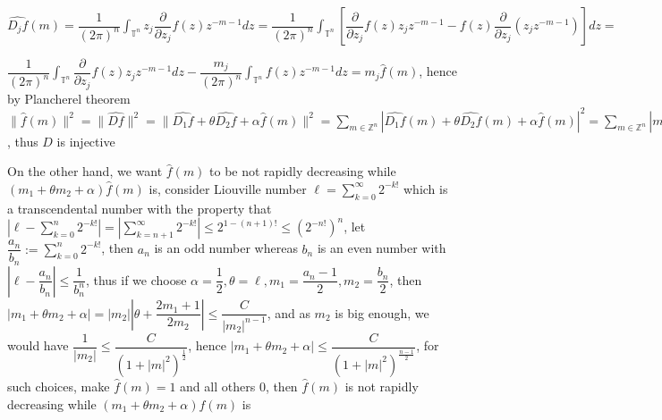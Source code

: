 \documentclass[10pt]{article}
\begin{document}
$\displaystyle\widehat{D_jf}(m)=\dfrac{1}{(2\pi)^n}\int_{\mathbb{T}^n}z_j\dfrac{\partial}{\partial z_j}f(z)z^{-m-1}dz=\dfrac{1}{(2\pi)^n}\int_{\mathbb{T}^n}\left[\dfrac{\partial}{\partial z_j}f(z)z_jz^{-m-1}-f(z)\dfrac{\partial}{\partial z_j}(z_jz^{-m-1})\right]dz=$ \par
$\dfrac{1}{(2\pi)^n}\int_{\mathbb{T}^n}\dfrac{\partial}{\partial z_j}f(z)z_jz^{-m-1}dz-\dfrac{m_j}{(2\pi)^n}\int_{\mathbb{T}^n}f(z)z^{-m-1}dz=m_j\widehat{f}(m)$, hence by Plancherel theorem
$\|\widehat{f}(m)\|^2=\|\widehat{Df}\|^2=\|\widehat{D_1f}+\theta\widehat{D_2f}+\alpha \widehat{f}(m)\|^2=\sum_{m\in\mathbb{Z}^n}|\widehat{D_1f}(m)+\theta\widehat{D_2f}(m)+\alpha \widehat{f}(m)|^2=\sum_{m\in\mathbb{Z}^n}|m_1\widehat{f}+\theta m_2\widehat{f}+\alpha \widehat{f}(m)|^2=\sum_{m\in\mathbb{Z}^n}|m_1+\theta m_2+\alpha|^2|\widehat{f}(m)|^2$, thus $D$ is injective \par
On the other hand, we want $\widehat{f}(m)$ to be not rapidly decreasing while $(m_1+\theta m_2+\alpha)\widehat{f}(m)$ is, consider Liouville number $\ell=\sum_{k=0}^{\infty}2^{-k!}$ which is a transcendental number with the property that $\left|\ell - \sum_{k=0}^{n}2^{-k!}\right|=\left|\sum_{k=n+1}^{\infty}2^{-k!}\right|\leq2^{1-(n+1)!}\leq\left(2^{-n!}\right)^n$, let $\dfrac{a_n}{b_n}:=\sum_{k=0}^{n}2^{-k!}$, then $a_n$ is an odd number whereas $b_n$ is an even number with $\left|\ell - \dfrac{a_n}{b_n}\right|\leq\dfrac{1}{b_n^n}$, thus if we choose $\alpha=\dfrac{1}{2}, \theta=\ell, m_1=\dfrac{a_n-1}{2}, m_2=\dfrac{b_n}{2}$, then $|m_1+\theta m_2+\alpha|=|m_2|\left|\theta + \dfrac{2m_1+1}{2m_2}\right|\leq\dfrac{C}{|m_2|^{n-1}}$, and as $m_2$ is big enough, we would have $\dfrac{1}{|m_2|}\leq\dfrac{C}{\left(1+|m|^2\right)^{\frac{1}{2}}}$, hence $|m_1+\theta m_2+\alpha|\leq\dfrac{C}{\left(1+|m|^2\right)^{\frac{n-1}{2}}}$, for such choices, make $\widehat{f}(m)=1$ and all others $0$, then $\widehat{f}(m)$ is not rapidly decreasing while $(m_1+\theta m_2+\alpha)\widehat{f}(m)$ is \par
\end{document}
